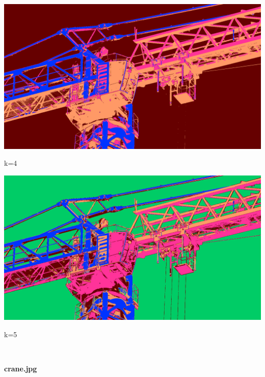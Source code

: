 \documentclass{article}
\begin{document}
\begin{newpage}
\begin{center}
\begin{minipage}{0.9\linewidth}
            \begin{minipage}{0.5\linewidth}
                \vspace{\gap}
                \centerline{\includegraphics[width=\textwidth]{src/crane_c4_output.png}}
                \centerline{k=4}
            \end{minipage}
            \begin{minipage}{0.5\linewidth}
                \vspace{\gap}
                \centerline{\includegraphics[width=\textwidth]{src/crane_c5_output.png}}
                \centerline{k=5}
            \end{minipage}\\
            \centerline{\textbf{crane.jpg}}
        \end{minipage}\\
    \end{center}
    \begin{center}
        \begin{minipage}{0.8\textwidth}
        \begin{minipage}{0.3\linewidth}
            \vspace{\gap}

\end{minipage}
\end{minipage}
\end{center}
\end{newpage}
\end{document}
